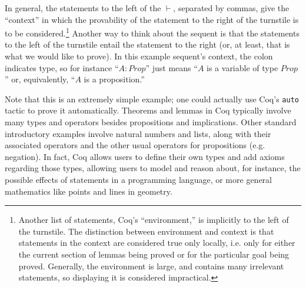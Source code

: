 \documentclass[11pt]{amsart}
\begin{document}
In general, the statements to the left of the $\vdash$, separated by commas, give the ``context'' in which the provability of the statement to the right of the turnstile is to be considered.\footnote{Another list of statements, Coq's ``environment,'' is implicitly to the left of the turnstile.  The distinction between environment and context is that statements in the context are considered true only locally, i.e. only for either the current section of lemmas being proved or for the particular goal being proved.  Generally, the environment is large, and contains many irrelevant statements, so displaying it is considered impractical.}  Another way to think about the sequent is that the statements to the left of the turnstile entail the statement to the right (or, at least, that is what we would like to prove).  In this example sequent's context, the colon indicates type, so for instance ``$A : Prop$'' just means ``$A$ is a variable of type $Prop$'' or, equivalently, ``$A$ is a proposition.''

Note that this is an extremely simple example; one could actually use Coq's \texttt{auto} tactic to prove it automatically.  Theorems and lemmas in Coq typically involve many types and operators besides propositions and implications.  Other standard introductory examples involve natural numbers and lists, along with their associated operators and the other usual operators for propositions (e.g. negation).  In fact, Coq allows users to define their own types and add axioms regarding those types, allowing users to model and reason about, for instance, the possible effects of statements in a programming language, or more general mathematics like points and lines in geometry.
\end{document}
